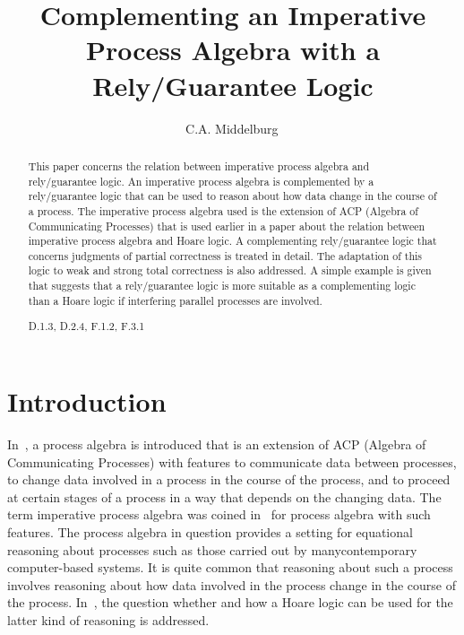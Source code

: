 \documentclass[runningheads]{llncs}
\title
 {Complementing an Imperative Process Algebra with a Rely/Guarantee Logic}
\author{C.A. Middelburg\,\orcidlink{0000-0002-8725-0197}}
\institute
 {Informatics Institute, Faculty of Science, University of Amsterdam \\
  Science Park~900, 1098~XH Amsterdam, the Netherlands \\
  \email{C.A.Middelburg@uva.nl}}
\begin{document}
\maketitle

\begin{abstract}
This paper concerns the relation between imperative process algebra and 
rely/guarantee logic. 
An imperative process algebra is complemented by a rely/guarantee logic 
that can be used to reason about how data change in the course of a 
process. 
The imperative process algebra \linebreak[2] used is the extension of 
ACP (Algebra of Communicating Processes) that is used earlier in a paper 
about the relation between imperative process algebra and Hoare logic.
A complementing rely/guarantee logic that concerns judgments of partial 
correctness is treated in detail. 
The adaptation of this logic to weak and strong total correctness is 
also addressed.
A simple example is given that suggests that a rely/guarantee logic is 
more suitable as a complementing logic than a Hoare logic if interfering
parallel processes are involved.


\begin{classcode}
D.1.3, D.2.4, F.1.2, F.3.1 
\end{classcode}
\end{abstract}

\section{Introduction}
\label{sect-intro}

In~\cite{BM19b}, a process algebra is introduced that is an extension of 
ACP (Algebra of Communicating Processes) with features to communicate 
data between processes, to change data involved in a process in the 
course of the process, and to proceed at certain stages of a process in 
a way that depends on the changing data. 
The term imperative process algebra was coined in~\cite{NP97a} for 
process algebra with such features.
The process algebra in question provides a setting for equational 
reasoning about processes such as those carried out by many\linebreak[2] 
contemporary computer-based systems.
It is quite common that reasoning about such a process involves 
reasoning about how data involved in the process change in the course of 
the process.
In~\cite{BM19b}, the question whether and how a Hoare logic can be used 
for the latter kind of reasoning is addressed.
\end{document}
